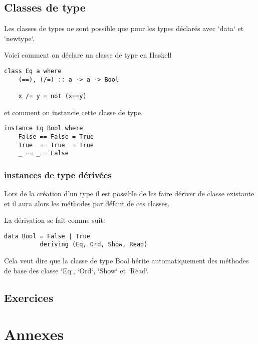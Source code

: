 \documentclass[11pt]{article}
\begin{document}
\subsection{Classes de type}
\label{sec:org032d8f8}
Les classes de types ne sont possible que pour les types déclarés avec `data` et `newtype`.

Voici comment on déclare un classe de type en Haskell
\begin{verbatim}
class Eq a where 
    (==), (/=) :: a -> a -> Bool 

    x /= y = not (x==y)
\end{verbatim}
et comment on instancie cette classe de type.
\begin{verbatim}
instance Eq Bool where
    False == False = True 
    True  == True  = True 
    _ == _ = False 
\end{verbatim}

\subsubsection{instances de type dérivées}
\label{sec:orga67ef43}
Lors de la création d'un type il est possible de les faire dériver  de classe existante et il aura alors les méthodes par défaut de ces classes.

La dérivation se fait comme suit:
\begin{verbatim}
data Bool = False | True
          deriving (Eq, Ord, Show, Read)
\end{verbatim}

Cela veut dire que la classe de type Bool hérite automatiquement des méthodes de base des classe `Eq`, `Ord`, `Show` et `Read`.

\subsection{Exercices}
\label{sec:org8e511b0}

\section{Annexes}
\label{sec:org724675b}
\end{document}
